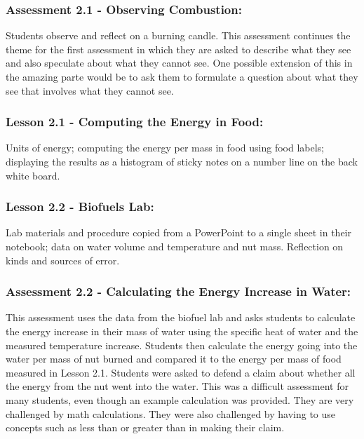 \documentclass[11pt]{article}
\begin{document}
\subsubsection{Assessment 2.1 - Observing Combustion:}
\label{sec:orgec552a1}

Students observe and reflect on a burning candle. This assessment continues the theme for the first assessment in which they are asked to
describe what they see and also speculate about what they cannot see. One possible extension
of this in the amazing parte would be to ask them to formulate a question about what they see
that involves what they cannot see.


\subsubsection{Lesson 2.1 - Computing the Energy in Food:}
\label{sec:org81ec925}

Units of energy; computing the energy per
mass in food using food labels; displaying the results as a histogram of sticky notes on a
number line on the back white board.


\subsubsection{Lesson 2.2 - Biofuels Lab:}
\label{sec:org50c726f}

Lab materials and procedure copied from a PowerPoint to a
single sheet in their notebook; data on water volume and temperature and nut mass.
Reflection on kinds and sources of error.


\subsubsection{Assessment 2.2 - Calculating the Energy Increase in Water:}
\label{sec:org2b9d92c}

This assessment uses the data from the biofuel lab and asks students to calculate the energy increase in their mass of water
using the specific heat of water and the measured temperature increase. Students then
calculate the energy going into the water per mass of nut burned and compared it to the energy
per mass of food measured in Lesson 2.1. Students were asked to defend a claim about
whether all the energy from the nut went into the water. This was a difficult assessment for
many students, even though an example calculation was provided. They are very challenged by
math calculations. They were also challenged by having to use concepts such as less than or
greater than in making their claim.
\end{document}
